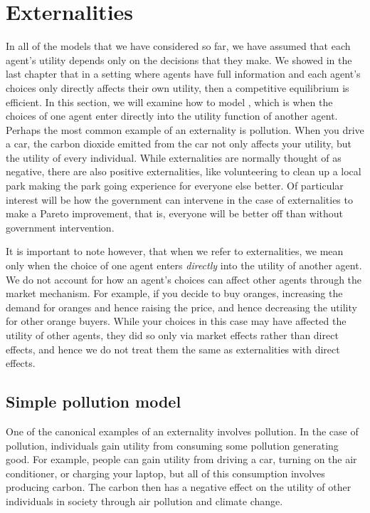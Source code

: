 \section{Externalities}
In all of the models that we have considered so far, we have assumed that each agent's utility depends only on the decisions that they make. We showed in the last chapter that in a setting where agents have full information and each agent's choices only directly affects their own utility, then a competitive equilibrium is efficient. In this section, we will examine how to model , which is when the choices of one agent enter directly into the utility function of another agent. Perhaps the most common example of an externality is pollution. When you drive a car, the carbon dioxide emitted from the car not only affects your utility, but the utility of every individual. While externalities are normally thought of as negative, there are also positive externalities, like volunteering to clean up a local park making the park going experience for everyone else better. Of particular interest will be how the government can intervene in the case of externalities to make a Pareto improvement, that is, everyone will be better off than without government intervention. 

It is important to note however, that when we refer to externalities, we mean only when the choice of one agent enters \emph{directly} into the utility of another agent. We do not account for how an agent's choices can affect other agents through the market mechanism. For example, if you decide to buy oranges, increasing the demand for oranges and hence raising the price, and hence decreasing the utility for other orange buyers. While your choices in this case may have affected the utility of other agents, they did so only via market effects rather than direct effects, and hence we do not treat them the same as externalities with direct effects. 

\subsection*{Simple pollution model}
One of the canonical examples of an externality involves pollution. In the case of pollution, individuals gain utility from consuming some pollution generating good. For example, people can gain utility from driving a car, turning on the air conditioner, or charging your laptop, but all of this consumption involves producing carbon. The carbon then has a negative effect on the utility of other individuals in society through air pollution and climate change. 


